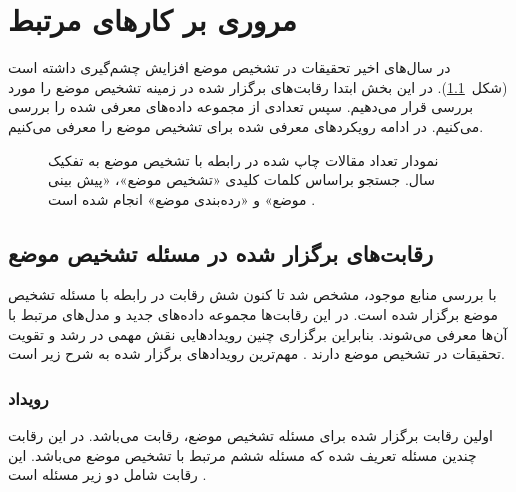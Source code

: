 \chapter{مروری بر کار‌های مرتبط}
\thispagestyle{empty}

در سال‌های اخیر تحقیقات در تشخیص موضع افزایش چشم‌گیری داشته است (شکل~\ref{StancePublicationPerYear}). در این بخش ابتدا رقابت‌های برگزار شده در زمینه تشخیص موضع را مورد بررسی قرار می‌دهیم. سپس تعدادی از مجموعه دادە‌های معرفی شده را بررسی می‌کنیم. در ادامه رویکردهای معرفی شده برای تشخیص موضع را معرفی می‌کنیم.

\begin{figure}[H]
	\caption[نمودار تعداد مقالات چاپ شده در رابطه با تشخیص موضع به تفکیک سال]
	{نمودار تعداد مقالات چاپ شده در رابطه با تشخیص موضع به تفکیک سال. جستجو براساس
		کلمات کلیدی «تشخیص موضع»، «پیش بینی موضع» و «ردە‌بندی موضع» انجام شده است \cite{ALDAYEL2021102597}.}

	\label{StancePublicationPerYear}
\end{figure}

\section{رقابت‌های برگزار شده در مسئله تشخیص موضع}
با بررسی منابع موجود، مشخص شد تا کنون شش رقابت در رابطه با مسئله تشخیص موضع برگزار شده است. در این رقابت‌ها مجموعە دادە‌های جدید و مدل‌های مرتبط با آن‌ها معرفی می‌شوند. بنابراین برگزاری چنین رویدادهایی نقش مهمی در رشد و تقویت تحقیقات در تشخیص موضع دارند \cite{10.1145/3369026}. مهم‌ترین رویدادهای برگزار شده به شرح زیر است.
\subsection{رویداد
	}
اولین رقابت برگزار شده برای مسئله تشخیص موضع، رقابت 
\href{https://alt.qcri.org/semeval2016/task6/}{}
می‌باشد. در این رقابت چندین مسئله تعریف شده که مسئله ششم مرتبط با تشخیص موضع می‌باشد. این رقابت شامل دو زیر مسئله است \cite{mohammad-etal-2016-semeval}.

